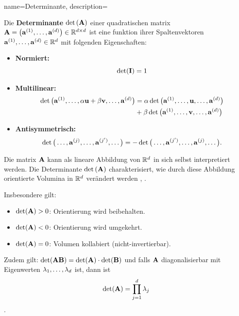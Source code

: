 {name={Determinante},
 description={Die \textbf{Determinante} $\det\,({\bf A})$ einer quadratischen \gls{matrix} 
	${\bf A} = \big( {\bf a}^{(1)},\ldots, {\bf a}^{(d)} \big) \in \mathbb{R}^{d \times d}$ 
	ist eine \gls{funktion} ihrer Spaltenvektoren ${\bf a}^{(1)},\ldots,{\bf a}^{(d)} \in \mathbb{R}^{d}$ 
	\cite{DirschmidHansJorg1996TuF} mit folgenden Eigenschaften:
	\begin{itemize}
		\item \textbf{Normiert:} $$\det (\mathbf{I}) = 1$$
		\item \textbf{Multilinear:}
		\begin{align} \nonumber
		\det \big({\bf a}^{(1)},\ldots,\alpha{\bf u}+ \beta {\bf v},\ldots,{\bf a}^{(d)} \big)
		&= \alpha\det \big({\bf a}^{(1)},\ldots,{\bf u},\ldots,{\bf a}^{(d)} \big) \\
		&+ \beta\det \big({\bf a}^{(1)},\ldots,{\bf v},\ldots,{\bf a}^{(d)} \big) \nonumber
		\end{align}
		\item \textbf{Antisymmetrisch:}
		$$\det \big(\ldots,{\bf a}^{(j)}, \ldots, {\bf a}^{(j')},\ldots \big) 
		= - \det \big(\ldots,{\bf a}^{(j')}, \ldots, {\bf a}^{(j)},\ldots \big).$$
	\end{itemize}
	
	Die \gls{matrix} ${\bf A}$ kann als lineare Abbildung von $\mathbb{R}^{d}$ in sich selbst interpretiert werden. 
	Die Determinante $\det\,({\bf A})$ charakterisiert, wie durch diese Abbildung orientierte Volumina in 
	$\mathbb{R}^{d}$ verändert werden \cite{GolubVanLoanBook}, \cite{Strang2007}. 
	
	Insbesondere gilt:
	\begin{itemize}
		\item $\det({\bf A}) > 0$: Orientierung wird beibehalten.
		\item $\det({\bf A}) < 0$: Orientierung wird umgekehrt.
		\item $\det({\bf A}) = 0$: Volumen kollabiert (nicht-invertierbar).
	\end{itemize}

	Zudem gilt: $\det({\bf A} {\bf B}) = \det({\bf A}) \cdot \det({\bf B})$ und falls ${\bf A}$ diagonalisierbar mit Eigenwerten 
	$\lambda_{1}, \ldots, \lambda_{d}$ ist, dann ist
	$$\det({\bf A}) = \prod_{j=1}^{d} \lambda_{j}$$
	\cite{HornMatAnalysis}.

}}
